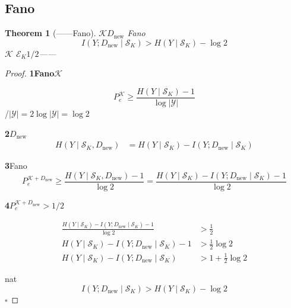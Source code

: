 \documentclass[11pt,a4paper]{article}
\newtheorem{theorem}{Theorem}[section]
\theoremstyle{remark}
\begin{document}
\subsection{Fano}

\begin{theorem}[——Fano]
\label{thm:paradigm_failure}
$\mathcal{K}$$D_{\text{new}}$
Fano
\begin{equation}
    \boxed{I(Y; D_{\text{new}} \mid \mathcal{S}_K) > H(Y \mid \mathcal{S}_K) - \log 2}
\end{equation}
$\mathcal{K}$
$\mathcal{E}_K$$1/2$——
\textbf{}
\end{theorem}

\begin{proof}
\textbf{1Fano}$\mathcal{K}$

\begin{equation}
    P_e^{\mathcal{K}} \geq \frac{H(Y \mid \mathcal{S}_K) - 1}{\log |\mathcal{Y}|}
\end{equation}
/$|\mathcal{Y}| = 2$$\log |\mathcal{Y}| = \log 2$

\textbf{2}$D_{\text{new}}$
\begin{align}
    H(Y \mid \mathcal{S}_K, D_{\text{new}})
    &= H(Y \mid \mathcal{S}_K) - I(Y; D_{\text{new}} \mid \mathcal{S}_K) 
\end{align}

\textbf{3}Fano
\begin{equation}
    P_e^{\mathcal{K} + D_{\text{new}}}
    \geq \frac{H(Y \mid \mathcal{S}_K, D_{\text{new}}) - 1}{\log 2}
    = \frac{H(Y \mid \mathcal{S}_K) - I(Y; D_{\text{new}} \mid \mathcal{S}_K) - 1}{\log 2}
\end{equation}

\textbf{4}$P_e^{\mathcal{K} + D_{\text{new}}} > 1/2$

\begin{align}
    \frac{H(Y \mid \mathcal{S}_K) - I(Y; D_{\text{new}} \mid \mathcal{S}_K) - 1}{\log 2} &> \frac{1}{2} \\
    H(Y \mid \mathcal{S}_K) - I(Y; D_{\text{new}} \mid \mathcal{S}_K) - 1 &> \frac{1}{2}\log 2 \\
    H(Y \mid \mathcal{S}_K) - I(Y; D_{\text{new}} \mid \mathcal{S}_K) &> 1 + \frac{1}{2}\log 2
\end{align}

nat
\begin{equation}
    I(Y; D_{\text{new}} \mid \mathcal{S}_K) > H(Y \mid \mathcal{S}_K) - \log 2
\end{equation}
\hfill $\square$
\end{proof}
\end{document}
